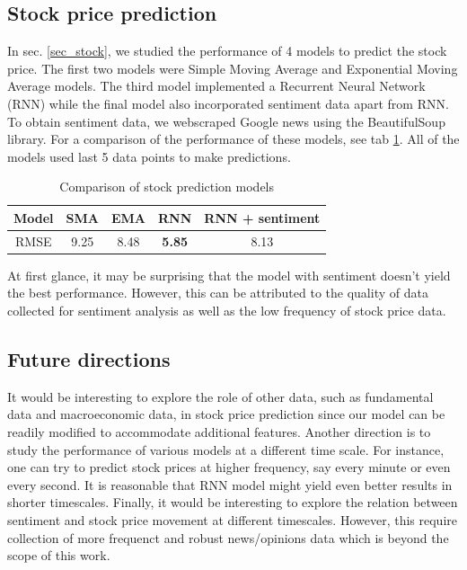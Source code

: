 \documentclass[11pt]{article}
\begin{document}
\subsection{Stock price prediction}
In sec. \ref{sec_stock}, we studied the performance of 4 models to predict the stock price. The first two models were Simple Moving Average and Exponential Moving Average models. The third model implemented a Recurrent Neural Network (RNN) while the final model also incorporated sentiment data apart from RNN. To obtain sentiment data, we webscraped Google news using the BeautifulSoup library. For a comparison of the performance of these models, see tab \ref{tab_comparison}. All of the models used last 5 data points to make predictions.
\begin{table}[h!]
	\centering
	\begin{tabular}{|c|c|c|c|c|}
		\hline
		Model & SMA & EMA & RNN & RNN + sentiment \\
		\hline
		RMSE & 9.25 & 8.48 & \textbf{5.85} & 8.13 \\
		\hline
	\end{tabular}
	\caption{Comparison of stock prediction models}
	\label{tab_comparison}
\end{table}
At first glance, it may be surprising that the model with sentiment doesn't yield the best performance. However, this can be attributed to the quality of data collected for sentiment analysis as well as the low frequency of stock price data. 
\subsection{Future directions}
It would be interesting to explore the role of other data, such as fundamental data and macroeconomic data, in stock price prediction since our model can be readily modified to accommodate additional features. Another direction is to study the performance of various models at a different time scale. For instance, one can try to predict stock prices at higher frequency, say every minute or even every second. It is reasonable that RNN model might yield even better results in shorter timescales.  Finally, it would be interesting to explore the relation between sentiment and stock price movement at different timescales. However, this require collection of more frequenct and robust news/opinions data which is beyond the scope of this work.

%
%
%
\end{document}
